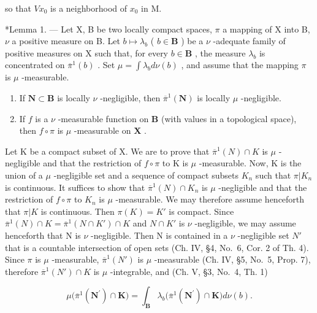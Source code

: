 so that \(Vx_{0}\) is a neighborhood of \(x_{0}\) in M.

\appendixheading

*Lemma 1. --- Let X, B be two locally compact spaces, \(\pi\) a mapping of X into B, \(\nu\) a positive measure on B. Let \(b \mapsto \lambda_b\) ( \(b \in \mathbf{B}\) ) be a \(\nu\) -adequate family of positive measures on X such that, for every \(b \in \mathbf{B}\) , the measure \(\lambda_b\) is concentrated on \(\overline{\pi}^1(b)\) . Set \(\mu = \int \lambda_b d\nu(b)\) , and assume that the mapping \(\pi\) is \(\mu\) -measurable.

\begin{enumerate}
\def\labelenumi{\alph{enumi})}
\item
  If \(\mathbf{N} \subset \mathbf{B}\) is locally \(\nu\) -negligible, then \(\overline{\pi}^1(\mathbf{N})\) is locally \(\mu\) -negligible.
\item
  If \(f\) is a \(\nu\) -measurable function on \(\mathbf{B}\) (with values in a topological space), then \(f \circ \pi\) is \(\mu\) -measurable on \(\mathbf{X}\) .
\end{enumerate}

Let K be a compact subset of X. We are to prove that \(\overline{\pi}^{1}(N) \cap K\) is \(\mu\) -negligible and that the restriction of \(f \circ \pi\) to K is \(\mu\) -measurable. Now, K is the union of a \(\mu\) -negligible set and a sequence of compact subsets \(K_{n}\) such that \(\pi|K_{n}\) is continuous. It suffices to show that \(\overline{\pi}^{1}(N) \cap K_{n}\) is \(\mu\) -negligible and that the restriction of \(f \circ \pi\) to \(K_{n}\) is \(\mu\) -measurable. We may therefore assume henceforth that \(\pi|K\) is continuous. Then \(\pi(K) = K'\) is compact. Since \(\overline{\pi}^{1}(N) \cap K = \overline{\pi}^{1}(N \cap K') \cap K\) and \(N \cap K'\) is \(\nu\) -negligible, we may assume henceforth that N is \(\nu\) -negligible. Then N is contained in a \(\nu\) -negligible set \(N'\) that is a countable intersection of open sets (Ch. IV, §4, No.~6, Cor. 2 of Th. 4). Since \(\pi\) is \(\mu\) -measurable, \(\overline{\pi}^{1}(N')\) is \(\mu\) -measurable (Ch. IV, §5, No.~5, Prop. 7), therefore \(\overline{\pi}^{1}(N') \cap K\) is \(\mu\) -integrable, and (Ch. V, §3, No.~4, Th. 1)

\[
\mu \big (\overline {{{{\pi}}}} ^ {1} (\mathbf {N} ^ {\prime}) \cap \mathbf {K} \big) = \int_ {\mathbf {B}} \lambda_ {b} \big (\overline {{{{\pi}}}} ^ {1} (\mathbf {N} ^ {\prime}) \cap \mathbf {K} \big) d \nu (b).
\]

